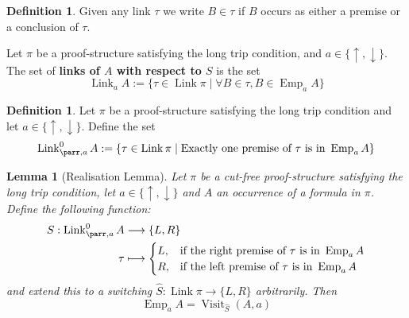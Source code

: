 \documentclass[12pt]{article}
\theoremstyle{plain}
\newtheorem{lemma}[thm]{Lemma}
\theoremstyle{definition}
\newtheorem{defn}[thm]{Definition} %
\newcommand{\lto}{\longrightarrow}
\begin{document}
\begin{defn}
Given any link $\tau$ we write $B \in \tau$ if $B$ occurs as either a premise or a conclusion of $\tau$.

Let $\pi$ be a proof-structure satisfying the long trip condition, and $a \in \lbrace \uparrow, \downarrow\rbrace$. The set of \textbf{links of $A$ with respect to $S$} is the set
\begin{equation}
    \operatorname{Link}_aA := \lbrace \tau \in \operatorname{Link}\pi \mid \forall B \in \tau, B \in \operatorname{Emp}_aA \rbrace
\end{equation}
\end{defn}
\begin{defn}
Let $\pi$ be a proof-structure satisfying the long trip condition and let $a \in \lbrace \uparrow, \downarrow \rbrace$. Define the set
\begin{equation}
    \operatorname{Link}^0_{\parr,a}A := \lbrace \tau \in \operatorname{Link}\pi \mid \text{Exactly one premise of }\tau\text{ is in }\operatorname{Emp}_{a}A\rbrace
\end{equation}
\end{defn}
\begin{lemma}[Realisation Lemma]\label{lem:realisation_switching}
Let $\pi$ be a cut-free proof-structure satisfying the long trip condition, let $a \in \lbrace \uparrow, \downarrow \rbrace$ and $A$ an occurrence of a formula in $\pi$. Define the following function:
\begin{align*}
    S: \operatorname{Link}_{\parr,a}^0A &\lto \lbrace L,R\rbrace\\
    \tau &\longmapsto
    \begin{cases}
    L, & \text{if the right premise of }\tau\text{ is in }\operatorname{Emp}_{a}A\\
    R, & \text{if the left premise of }\tau\text{ is in }\operatorname{Emp}_{a}A
    \end{cases}
\end{align*}
and extend this to a switching $\hat{S}: \operatorname{Link}\pi \lto \lbrace L,R \rbrace$ arbitrarily. Then
\begin{equation}
    \operatorname{Emp}_aA = \operatorname{Visit}_{\hat{S}}(A,a)
\end{equation}
\end{lemma}
\end{document}
